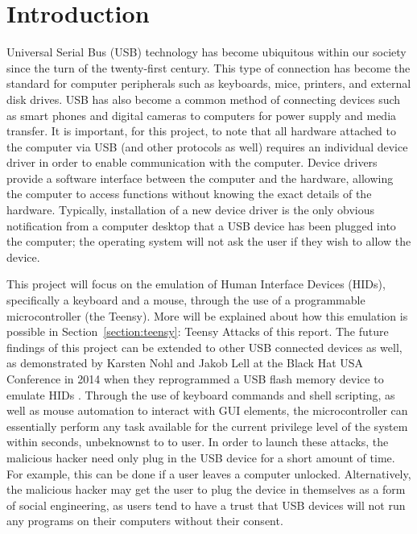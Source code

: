 \documentclass[pagenumbers]{ieee}
\begin{document}
\section{Introduction}
\label{section:intro}

Universal Serial Bus (USB) technology has become ubiquitous within our society since the turn of the twenty-first century. This type of connection has become the standard for computer peripherals such as keyboards, mice, printers, and external disk drives. USB has also become a common method of connecting devices such as smart phones and digital cameras to computers for power supply and media transfer. It is important, for this project, to note that all hardware attached to the computer via USB (and other protocols as well) requires an individual device driver in order to enable communication with the computer. Device drivers provide a software interface between the computer and the hardware, allowing the computer to access functions without knowing the exact details of the hardware. Typically, installation of a new device driver is the only obvious notification from a computer desktop that a USB device has been plugged into the computer; the operating system will not ask the user if they wish to allow the device.

This project will focus on the emulation of Human Interface Devices (HIDs), specifically a keyboard and a mouse, through the use of a programmable microcontroller (the Teensy). More will be explained about how this emulation is possible in Section~\ref{section:teensy}: Teensy Attacks of this report. The future findings of this project can be extended to other USB connected devices as well, as demonstrated by Karsten Nohl and Jakob Lell at the Black Hat USA Conference in 2014 when they reprogrammed a USB flash memory device to emulate HIDs \cite{nohl}. Through the use of keyboard commands and shell scripting, as well as mouse automation to interact with GUI elements, the microcontroller can essentially perform any task available for the current privilege level of the system within seconds, unbeknownst to to user. In order to launch these attacks, the malicious hacker need only plug in the USB device for a short amount of time. For example, this can be done if a user leaves a computer unlocked. Alternatively, the malicious hacker may get the user to plug the device in themselves as a form of social engineering, as users tend to have a trust that USB devices will not run any programs on their computers without their consent.
\end{document}
